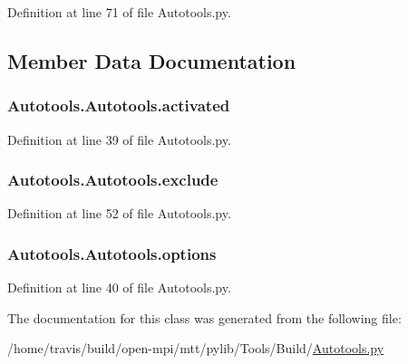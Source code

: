 Definition at line 71 of file Autotools.\-py.



\subsection{Member Data Documentation}
\hypertarget{classAutotools_1_1Autotools_a6bbb714a91bc8b6fe749326772b073b3}{
\subsubsection[{activated}]{\setlength{\rightskip}{0pt plus 5cm}Autotools.\-Autotools.\-activated}}\label{classAutotools_1_1Autotools_a6bbb714a91bc8b6fe749326772b073b3}


Definition at line 39 of file Autotools.\-py.

\hypertarget{classAutotools_1_1Autotools_aee37d9789ea22ee310ebc357cd721b7f}{
\subsubsection[{exclude}]{\setlength{\rightskip}{0pt plus 5cm}Autotools.\-Autotools.\-exclude}}\label{classAutotools_1_1Autotools_aee37d9789ea22ee310ebc357cd721b7f}


Definition at line 52 of file Autotools.\-py.

\hypertarget{classAutotools_1_1Autotools_a8b348e19f0a7104bde9c43c3a6ed695d}{
\subsubsection[{options}]{\setlength{\rightskip}{0pt plus 5cm}Autotools.\-Autotools.\-options}}\label{classAutotools_1_1Autotools_a8b348e19f0a7104bde9c43c3a6ed695d}


Definition at line 40 of file Autotools.\-py.



The documentation for this class was generated from the following file\-:\begin{DoxyCompactItemize}
\item 
/home/travis/build/open-\/mpi/mtt/pylib/\-Tools/\-Build/\hyperlink{Autotools_8py}{Autotools.\-py}\end{DoxyCompactItemize}
